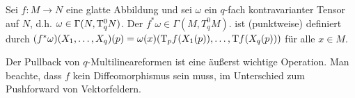 \begin{df} \label{5.17}
    Sei $f: M \to N$ eine glatte Abbildung und sei $\omega$ ein $q$-fach kontravarianter Tensor auf $N$, d.h. $\omega \in \Gamma(N, \mathrm{T}_q^0 N)$.
    Der  $f^* \omega \in \Gamma(M, T_q^0 M)$. ist (punktweise) definiert durch
    \begin{math}
        (f^* \omega)(X_1, \dotsc, X_q)(p)
        = \omega(x)(\mathrm{T}_p f(X_1(p)), \dotsc, \mathrm{T} f(X_q(p)))
    \end{math}
    für alle $x \in M$.
    \begin{note}
        Der Pullback von $q$-Multilineareformen ist eine äußerst wichtige Operation.
        Man beachte, dass $f$ kein Diffeomorphismus sein muss, im Unterschied zum Pushforward von Vektorfeldern.
    \end{note}
\end{df}



